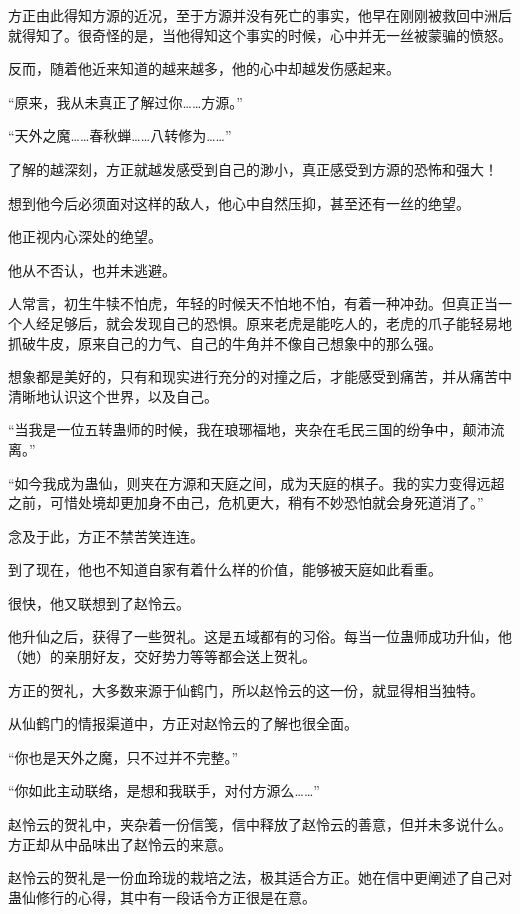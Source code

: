 \begin{this_body}
方正由此得知方源的近况，至于方源并没有死亡的事实，他早在刚刚被救回中洲后就得知了。很奇怪的是，当他得知这个事实的时候，心中并无一丝被蒙骗的愤怒。

反而，随着他近来知道的越来越多，他的心中却越发伤感起来。

“原来，我从未真正了解过你……方源。”

“天外之魔……春秋蝉……八转修为……”

了解的越深刻，方正就越发感受到自己的渺小，真正感受到方源的恐怖和强大！

想到他今后必须面对这样的敌人，他心中自然压抑，甚至还有一丝的绝望。

他正视内心深处的绝望。

他从不否认，也并未逃避。

人常言，初生牛犊不怕虎，年轻的时候天不怕地不怕，有着一种冲劲。但真正当一个人经足够后，就会发现自己的恐惧。原来老虎是能吃人的，老虎的爪子能轻易地抓破牛皮，原来自己的力气、自己的牛角并不像自己想象中的那么强。

想象都是美好的，只有和现实进行充分的对撞之后，才能感受到痛苦，并从痛苦中清晰地认识这个世界，以及自己。

“当我是一位五转蛊师的时候，我在琅琊福地，夹杂在毛民三国的纷争中，颠沛流离。”

“如今我成为蛊仙，则夹在方源和天庭之间，成为天庭的棋子。我的实力变得远超之前，可惜处境却更加身不由己，危机更大，稍有不妙恐怕就会身死道消了。”

念及于此，方正不禁苦笑连连。

到了现在，他也不知道自家有着什么样的价值，能够被天庭如此看重。

很快，他又联想到了赵怜云。

他升仙之后，获得了一些贺礼。这是五域都有的习俗。每当一位蛊师成功升仙，他（她）的亲朋好友，交好势力等等都会送上贺礼。

方正的贺礼，大多数来源于仙鹤门，所以赵怜云的这一份，就显得相当独特。

从仙鹤门的情报渠道中，方正对赵怜云的了解也很全面。

“你也是天外之魔，只不过并不完整。”

“你如此主动联络，是想和我联手，对付方源么……”

赵怜云的贺礼中，夹杂着一份信笺，信中释放了赵怜云的善意，但并未多说什么。方正却从中品味出了赵怜云的来意。

赵怜云的贺礼是一份血玲珑的栽培之法，极其适合方正。她在信中更阐述了自己对蛊仙修行的心得，其中有一段话令方正很是在意。


\end{this_body}
